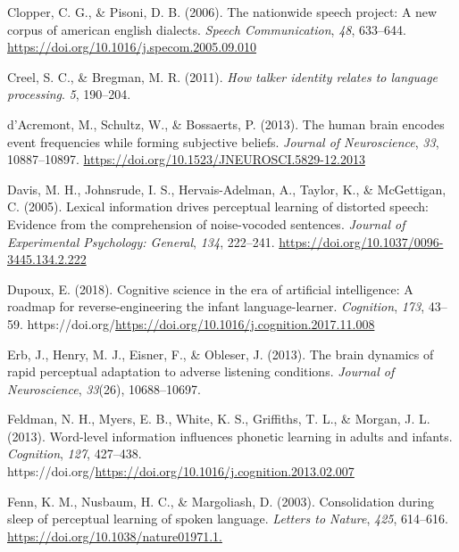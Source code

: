 \documentclass[
  11pt,
  english,
  man,floatsintext]{apa6}
\newlength{\cslhangindent}
\newlength{\cslentryspacingunit} %
\newenvironment{CSLReferences}[2] %
 {%
  \setlength{\parindent}{0pt}
  \ifodd #1
  \let\oldpar\par
  \def\par{\hangindent=\cslhangindent\oldpar}
  \fi
  \setlength{\parskip}{#2\cslentryspacingunit}
 }%
 {}
\begin{document}
\begin{CSLReferences}{1}{0}
\leavevmode{}%
Clopper, C. G., \& Pisoni, D. B. (2006). The nationwide speech project: A new corpus of american english dialects. \emph{Speech Communication}, \emph{48}, 633--644. \url{https://doi.org/10.1016/j.specom.2005.09.010}

\leavevmode{}%
Creel, S. C., \& Bregman, M. R. (2011). \emph{How talker identity relates to language processing}. \emph{5}, 190--204.

\leavevmode{}%
d'Acremont, M., Schultz, W., \& Bossaerts, P. (2013). The human brain encodes event frequencies while forming subjective beliefs. \emph{Journal of Neuroscience}, \emph{33}, 10887--10897. \url{https://doi.org/10.1523/JNEUROSCI.5829-12.2013}

\leavevmode{}%
Davis, M. H., Johnsrude, I. S., Hervais-Adelman, A., Taylor, K., \& McGettigan, C. (2005). Lexical information drives perceptual learning of distorted speech: Evidence from the comprehension of noise-vocoded sentences. \emph{Journal of Experimental Psychology: General}, \emph{134}, 222--241. \url{https://doi.org/10.1037/0096-3445.134.2.222}

\leavevmode{}%
Dupoux, E. (2018). Cognitive science in the era of artificial intelligence: A roadmap for reverse-engineering the infant language-learner. \emph{Cognition}, \emph{173}, 43--59. https://doi.org/\url{https://doi.org/10.1016/j.cognition.2017.11.008}

\leavevmode{}%
Erb, J., Henry, M. J., Eisner, F., \& Obleser, J. (2013). The brain dynamics of rapid perceptual adaptation to adverse listening conditions. \emph{Journal of Neuroscience}, \emph{33}(26), 10688--10697.

\leavevmode{}%
Feldman, N. H., Myers, E. B., White, K. S., Griffiths, T. L., \& Morgan, J. L. (2013). Word-level information influences phonetic learning in adults and infants. \emph{Cognition}, \emph{127}, 427--438. https://doi.org/\url{https://doi.org/10.1016/j.cognition.2013.02.007}

\leavevmode{}%
Fenn, K. M., Nusbaum, H. C., \& Margoliash, D. (2003). Consolidation during sleep of perceptual learning of spoken language. \emph{Letters to Nature}, \emph{425}, 614--616. \url{https://doi.org/10.1038/nature01971.1.}


\end{CSLReferences}
\end{document}
